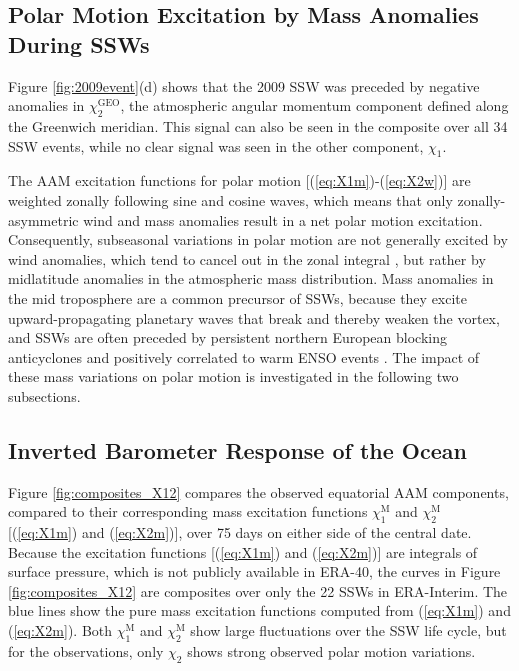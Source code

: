 \documentclass[draft,jgrga]{agutex}
\begin{document}
\begin{article}
\section{Polar Motion Excitation by Mass Anomalies During SSWs}
\label{sec:X12}

Figure \ref{fig:2009event}(d) shows that the 2009 SSW was preceded by  {negative anomalies} in $\chi_2^{\text{GEO}}$,  {the atmospheric angular momentum component defined along the Greenwich meridian}.
This signal  can also be  seen in the composite over all 34 SSW events, while no clear signal was seen in the other component, $\chi_1$.

The AAM excitation functions for polar motion  [(\ref{eq:X1m})-(\ref{eq:X2w})] are weighted zonally following sine and cosine waves, which  means that only zonally-asymmetric wind and mass anomalies result in a net polar motion excitation.
Consequently,  subseasonal variations in polar motion are not generally excited by wind anomalies, which tend to cancel out in the zonal integral \citep{barnesetal1983,Eubanks1988}, but rather by  midlatitude anomalies in the atmospheric mass distribution. 
Mass anomalies in the mid troposphere are a common precursor of SSWs, because they excite upward-propagating planetary waves that break and thereby weaken the vortex, and
SSWs are often preceded by persistent northern European blocking anticyclones \citep{quiroz1986, martiusetal2009, woollingsetal2010} and positively correlated to warm ENSO events \citep{Garfinkel2008}.
The impact of these mass variations on polar motion is investigated in the following two subsections.  

\subsection{ {Inverted Barometer Response of the Ocean}}
\label{sec:IB}
Figure \ref{fig:composites_X12} compares the observed  {equatorial AAM components,  compared to their corresponding mass excitation functions}  $\chi_1^{\text{M}}$ and $\chi_2^{\text{M}}$ [(\ref{eq:X1m}) and (\ref{eq:X2m})], over 75 days on either side of the central date.
Because the excitation functions [(\ref{eq:X1m}) and (\ref{eq:X2m})] are integrals of surface pressure, which is not publicly available in ERA-40, the curves in Figure \ref{fig:composites_X12} are composites over only the 22 SSWs in  ERA-Interim.
The  {blue} lines show the pure mass excitation functions computed from (\ref{eq:X1m}) and (\ref{eq:X2m}).
Both $\chi_1^{\text{M}}$ and $\chi_2^{\text{M}}$ show large fluctuations over the SSW life cycle,  {but for the observations, only} $\chi_2$ shows strong observed polar motion variations. 


\end{article}
\end{document}
